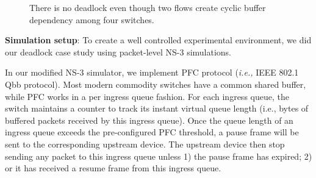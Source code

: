 \begin{figure}[t]
\caption{There is no deadlock even though two flows create cyclic buffer dependency among four switches.}
\label{fig:case1}
\end{figure}

 \textbf{Simulation setup}: To create a well controlled experimental environment, 
 we did our deadlock case study using packet-level NS-3 simulations. 
 
 In our modified NS-3 simulator, we implement PFC protocol ({\em i.e.,} IEEE 802.1 Qbb protocol). 
 Most modern commodity switches have a common shared buffer, while PFC works in a per ingress 
 queue fashion. For each ingress queue, the switch maintains a counter to 
 track its instant virtual queue length (i.e., bytes of buffered packets received by this 
 ingress queue). Once the queue length of an ingress queue exceeds the pre-configured PFC 
 threshold, a pause frame will be sent to the corresponding upstream device. The upstream 
 device then stop sending any packet to this ingress queue unless 1) the pause frame has 
 expired; 2) or it has received a resume frame from this ingress queue.


